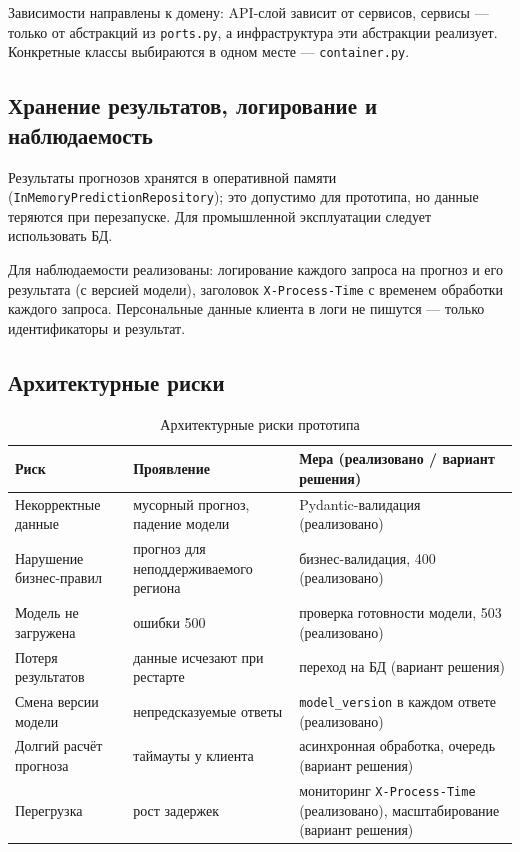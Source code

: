 \documentclass[12pt,a4paper]{article}
\begin{document}
Зависимости направлены к домену: API-слой зависит от сервисов, сервисы --- только от абстракций из \texttt{ports.py}, а инфраструктура эти абстракции реализует. Конкретные классы выбираются в одном месте --- \texttt{container.py}.

\subsection{Хранение результатов, логирование и наблюдаемость}

Результаты прогнозов хранятся в оперативной памяти (\texttt{InMemoryPredictionRepository}); это допустимо для прототипа, но данные теряются при перезапуске. Для промышленной эксплуатации следует использовать БД.

Для наблюдаемости реализованы: логирование каждого запроса на прогноз и его результата (с версией модели), заголовок \texttt{X-Process-Time} с временем обработки каждого запроса. Персональные данные клиента в логи не пишутся --- только идентификаторы и результат.

\subsection{Архитектурные риски}

\begin{table}[H]
\centering
\caption{Архитектурные риски прототипа}
\begin{tabular}{|L{4cm}|L{5.3cm}|L{6cm}|}
\hline
\textbf{Риск} & \textbf{Проявление} & \textbf{Мера (реализовано / вариант решения)} \\
\hline
Некорректные данные & мусорный прогноз, падение модели & Pydantic-валидация (реализовано) \\
Нарушение бизнес-правил & прогноз для неподдерживаемого региона & бизнес-валидация, 400 (реализовано) \\
Модель не загружена & ошибки 500 & проверка готовности модели, 503 (реализовано) \\
Потеря результатов & данные исчезают при рестарте & переход на БД (вариант решения) \\
Смена версии модели & непредсказуемые ответы & \texttt{model\_version} в каждом ответе (реализовано) \\
Долгий расчёт прогноза & таймауты у клиента & асинхронная обработка, очередь (вариант решения) \\
Перегрузка & рост задержек & мониторинг \texttt{X-Process-Time} (реализовано), масштабирование (вариант решения) \\
\hline
\end{tabular}
\end{table}
\end{document}
